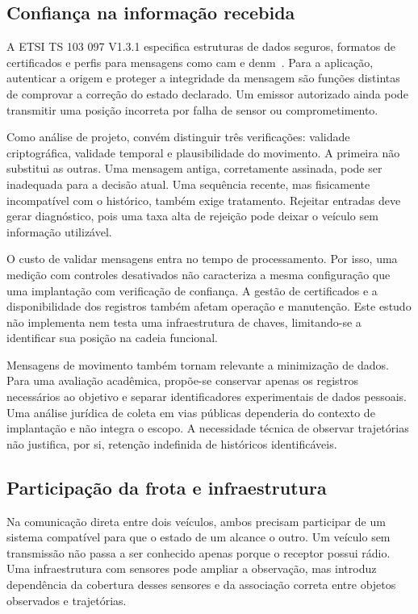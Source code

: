 \documentclass[conference,a4paper]{IEEEtran}
\begin{document}
\subsection{Confiança na informação recebida}
A ETSI TS 103 097 V1.3.1 especifica estruturas de dados seguros, formatos de certificados e perfis para mensagens como \ac{cam} e \ac{denm}~\cite{etsiSecurity2017}. Para a aplicação, autenticar a origem e proteger a integridade da mensagem são funções distintas de comprovar a correção do estado declarado. Um emissor autorizado ainda pode transmitir uma posição incorreta por falha de sensor ou comprometimento.

Como análise de projeto, convém distinguir três verificações: validade criptográfica, validade temporal e plausibilidade do movimento. A primeira não substitui as outras. Uma mensagem antiga, corretamente assinada, pode ser inadequada para a decisão atual. Uma sequência recente, mas fisicamente incompatível com o histórico, também exige tratamento. Rejeitar entradas deve gerar diagnóstico, pois uma taxa alta de rejeição pode deixar o veículo sem informação utilizável.

O custo de validar mensagens entra no tempo de processamento. Por isso, uma medição com controles desativados não caracteriza a mesma configuração que uma implantação com verificação de confiança. A gestão de certificados e a disponibilidade dos registros também afetam operação e manutenção. Este estudo não implementa nem testa uma infraestrutura de chaves, limitando-se a identificar sua posição na cadeia funcional.

Mensagens de movimento também tornam relevante a minimização de dados. Para uma avaliação acadêmica, propõe-se conservar apenas os registros necessários ao objetivo e separar identificadores experimentais de dados pessoais. Uma análise jurídica de coleta em vias públicas dependeria do contexto de implantação e não integra o escopo. A necessidade técnica de observar trajetórias não justifica, por si, retenção indefinida de históricos identificáveis.

\subsection{Participação da frota e infraestrutura}
Na comunicação direta entre dois veículos, ambos precisam participar de um sistema compatível para que o estado de um alcance o outro. Um veículo sem transmissão não passa a ser conhecido apenas porque o receptor possui rádio. Uma infraestrutura com sensores pode ampliar a observação, mas introduz dependência da cobertura desses sensores e da associação correta entre objetos observados e trajetórias.
\end{document}

